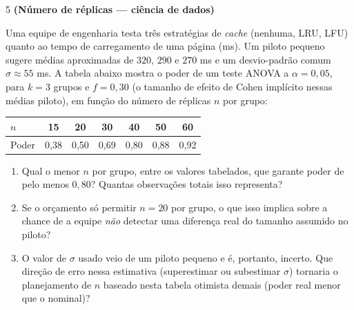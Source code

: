 \documentclass[11pt]{article}
\begin{document}
\begin{questao}{5} \textbf{(Número de réplicas --- ciência de dados)}

Uma equipe de engenharia testa três estratégias de \emph{cache} (nenhuma, LRU, LFU) quanto ao
tempo de carregamento de uma página (ms). Um piloto pequeno sugere médias aproximadas de
$320$, $290$ e $270$ ms e um desvio-padrão comum $\sigma \approx 55$ ms. A tabela abaixo mostra o
poder de um teste ANOVA a $\alpha = 0{,}05$, para $k=3$ grupos e $f = 0{,}30$ (o tamanho de efeito
de Cohen implícito nessas médias piloto), em função do número de réplicas $n$ por grupo:

\begin{center}
\begin{tabular}{lcccccc}
\toprule
$n$ & 15 & 20 & 30 & 40 & 50 & 60 \\
\midrule
Poder & 0{,}38 & 0{,}50 & 0{,}69 & 0{,}80 & 0{,}88 & 0{,}92 \\
\bottomrule
\end{tabular}
\end{center}

\begin{enumerate}[label=(\alph*)]
  \item Qual o menor $n$ por grupo, entre os valores tabelados, que garante poder de pelo menos
    $0{,}80$? Quantas observações totais isso representa?
  \item Se o orçamento só permitir $n=20$ por grupo, o que isso implica sobre a chance de a
    equipe \emph{não} detectar uma diferença real do tamanho assumido no piloto?
  \item O valor de $\sigma$ usado veio de um piloto pequeno e é, portanto, incerto. Que direção de
    erro nessa estimativa (superestimar ou subestimar $\sigma$) tornaria o planejamento de $n$
    baseado nesta tabela otimista demais (poder real menor que o nominal)?
\end{enumerate}
\end{questao}
\end{document}
